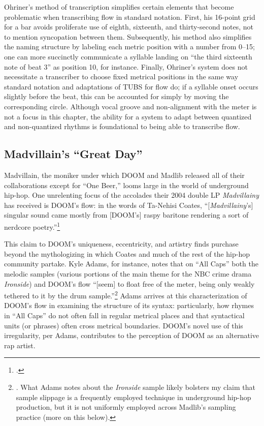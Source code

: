 Ohriner's method of transcription simplifies certain elements that become problematic when transcribing 
flow in standard notation. First, his 16-point grid for a bar avoids proliferate use of eighth, sixteenth,
and thirty-second notes, not to mention syncopation between them. Subsequently, his method also simplifies 
the naming structure by labeling each metric position with a number from 0--15; one can more succinctly
communicate a syllable landing on ``the third sixteenth note of beat 3'' as position 10, for instance. 
Finally, Ohriner's system does not necessitate a transcriber to choose fixed metrical positions in the 
same way standard notation and adaptations of TUBS for flow do; if a syllable onset occurs slightly before
the beat, this can be accounted for simply by moving the corresponding circle. Although vocal groove and
non-alignment with the meter is not a focus in this chapter, the ability for a system to adapt between
quantized and non-quantized rhythms is foundational to being able to transcribe flow.

\subsection*{\centering Madvillain's ``Great Day''}

Madvillain, the moniker under which DOOM and Madlib released all of their collaborations except for
``One Beer,'' looms large in the world of underground hip-hop. One unrelenting focus of the accolades
their 2004 double LP \textit{Madvillainy} has received is DOOM's flow: in the words of Ta-Nehisi Coates,
``[\textit{Madvillainy}'s] singular sound came mostly from [DOOM's] raspy baritone rendering a sort of
nerdcore poetry.''\footnote{
    \cite{ta-nehisicoatesMaskDoomNonconformist2009}.}

This claim to DOOM's uniqueness, eccentricity, and artistry finds purchase beyond the mythologizing in
which Coates and much of the rest of the hip-hop community partake. Kyle Adams, for instance, notes that
on ``All Caps'' both the melodic samples (various portions of the main theme for the NBC crime drama 
\textit{Ironside}) and DOOM's flow ``[seem] to float free of the meter, being only weakly tethered to
it by the drum sample.''\footnote{
    \cite{kyleadamsMetricalTechniquesFlow2009}. What Adams notes about the \textit{Ironside} sample likely
    bolsters my claim that sample slippage is a frequently employed technique in underground hip-hop production,
    but it is not uniformly employed across Madlib's sampling practice (more on this below).}
Adams arrives at this characterization of DOOM's flow in examining the structure of its syntax: particularly,
how rhymes in ``All Caps'' do not often fall in regular metrical places and that syntactical units (or phrases) 
often cross metrical boundaries. DOOM's novel use of this irregularity, per Adams, contributes to the perception
of DOOM as an alternative rap artist.

